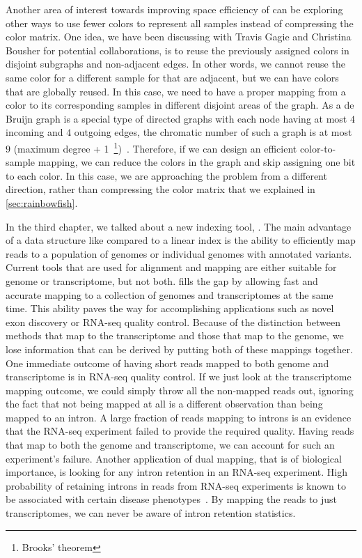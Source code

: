 Another area of interest towards improving space efficiency of \cdbgs can be exploring other ways to use fewer colors to represent all samples instead of compressing the color matrix. One idea, we have been discussing with Travis Gagie and Christina Bousher for potential collaborations, is to reuse the previously assigned colors in disjoint subgraphs and non-adjacent edges. In other words, we cannot reuse the same color for a different sample for \kmers that are adjacent, but we can have colors that are globally reused. In this case, we need to have a proper mapping from a color to its corresponding samples in different disjoint areas of the graph. As a de Bruijn graph is a special type of directed graphs with each node having at most $4$ incoming and $4$ outgoing edges, the chromatic number of such a graph is at most $9$ (maximum degree + 1~\footnote{Brooks' theorem})~\cite{cranston2015brooks}. Therefore, if we can design an efficient color-to-sample mapping, we can reduce the colors in the graph and skip assigning one bit to each color. In this case, we are approaching the problem from a different direction, rather than compressing the color matrix that we explained in \ref{sec:rainbowfish}.

In the third chapter, we talked about a new indexing tool, \pufferfish. The main advantage of a data structure like \pufferfish compared to a linear index is the ability to efficiently map reads to a population of genomes or individual genomes with annotated variants. Current tools that are used for alignment and mapping are either suitable for genome or transcriptome, but not both. \pufferfish fills the gap by allowing fast and accurate mapping to a collection of genomes and transcriptomes at the same time. This ability paves the way for accomplishing applications such as novel exon discovery or RNA-seq quality control. 
Because of the distinction between methods that map to the transcriptome and those that map to the genome, we lose information that can be derived by putting both of these mappings together. One immediate outcome of having short reads mapped to both genome and transcriptome is in RNA-seq quality control. If we just look at the transcriptome mapping outcome, we could simply throw all the non-mapped reads out, ignoring the fact that not being mapped at all is a different observation than being mapped to an intron. A large fraction of reads mapping to introns is an evidence that the RNA-seq experiment failed to provide the required quality. Having reads that map to both the genome and transcriptome, we can account for such an experiment's failure. Another application of dual mapping, that is of biological importance, is looking for any intron retention in an RNA-seq experiment. High probability of retaining introns in reads from RNA-seq experiments is known to be associated with certain disease phenotypes~\cite{faustino2003pre,tazi2009alternative}. By mapping the reads to just transcriptomes, we can never be aware of intron retention statistics.

